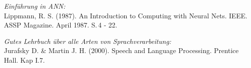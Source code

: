 \documentclass[11pt]{book}
\begin{document}


        {\em Einführung in ANN:}\\
	Lippmann, R. S. (1987). An Introduction to Computing with Neural Nets.
	IEEE. ASSP Magazine. April 1987. S.\,4 - 22.





        {\em Gutes Lehrbuch über alle Arten von Sprachverarbeitung:}\\
        Jurafsky D. \& Martin J. H. (2000). Speech and Language Processing. 
	Prentice Hall. Kap I.7.

\end{document}
